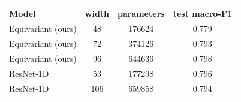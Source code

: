 \begin{tabular}{lccc}
\toprule
Model & width & parameters & test macro-F1 \\
\midrule
  Equivariant (ours) & 48 & 176624 & 0.779 \\
  Equivariant (ours) & 72 & 374126 & 0.793 \\
  Equivariant (ours) & 96 & 644636 & 0.798 \\
  ResNet-1D & 53 & 177298 & 0.796 \\
  ResNet-1D & 106 & 659858 & 0.794 \\
\bottomrule
\end{tabular}